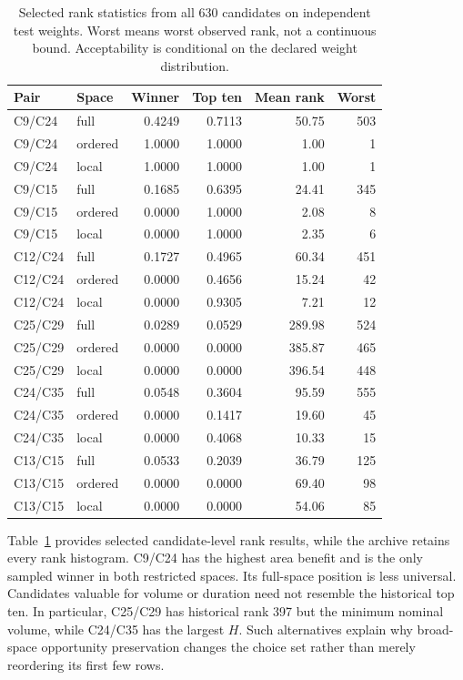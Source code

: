 \documentclass{llncs}
\begin{document}
\begin{table}[tbp]\caption{Selected rank statistics from all 630 candidates on independent test weights. Worst means worst observed rank, not a continuous bound. Acceptability is conditional on the declared weight distribution.}\label{tab:ranks}\centering
\small
\begin{tabular}{llrrrr}\toprule
Pair & Space & Winner & Top ten & Mean rank & Worst\\\midrule
C9/C24 & full & 0.4249 & 0.7113 & 50.75 & 503\\
C9/C24 & ordered & 1.0000 & 1.0000 & 1.00 & 1\\
C9/C24 & local & 1.0000 & 1.0000 & 1.00 & 1\\
C9/C15 & full & 0.1685 & 0.6395 & 24.41 & 345\\
C9/C15 & ordered & 0.0000 & 1.0000 & 2.08 & 8\\
C9/C15 & local & 0.0000 & 1.0000 & 2.35 & 6\\
C12/C24 & full & 0.1727 & 0.4965 & 60.34 & 451\\
C12/C24 & ordered & 0.0000 & 0.4656 & 15.24 & 42\\
C12/C24 & local & 0.0000 & 0.9305 & 7.21 & 12\\
C25/C29 & full & 0.0289 & 0.0529 & 289.98 & 524\\
C25/C29 & ordered & 0.0000 & 0.0000 & 385.87 & 465\\
C25/C29 & local & 0.0000 & 0.0000 & 396.54 & 448\\
C24/C35 & full & 0.0548 & 0.3604 & 95.59 & 555\\
C24/C35 & ordered & 0.0000 & 0.1417 & 19.60 & 45\\
C24/C35 & local & 0.0000 & 0.4068 & 10.33 & 15\\
C13/C15 & full & 0.0533 & 0.2039 & 36.79 & 125\\
C13/C15 & ordered & 0.0000 & 0.0000 & 69.40 & 98\\
C13/C15 & local & 0.0000 & 0.0000 & 54.06 & 85\\
\bottomrule\end{tabular}

\end{table}


Table~\ref{tab:ranks} provides selected candidate-level rank results, while the archive retains every rank histogram. C9/C24 has the highest area benefit and is the only sampled winner in both restricted spaces. Its full-space position is less universal. Candidates valuable for volume or duration need not resemble the historical top ten. In particular, C25/C29 has historical rank 397 but the minimum nominal volume, while C24/C35 has the largest $H$. Such alternatives explain why broad-space opportunity preservation changes the choice set rather than merely reordering its first few rows.
\end{document}
